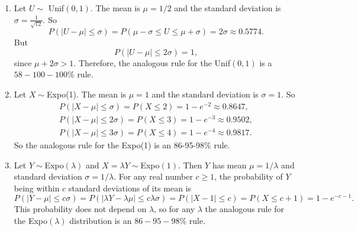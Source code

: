 

\setcounter{theorem}{5}
\begin{exercise}[BH.5.6] 
\begin{solution}
    \begin{enumerate}
        \item Let $U \sim$  {Unif}$(0,1)$. The mean is $\mu=1 / 2$ and the standard deviation is $\sigma=\frac{1}{\sqrt{12}}$. So
        $$
        P(|U-\mu| \leq \sigma)=P(\mu-\sigma \leq U \leq \mu+\sigma)=2 \sigma \approx 0.5774 .
        $$
        But
        $$
        P(|U-\mu| \leq 2 \sigma)=1,
        $$
        since $\mu+2 \sigma>1$. Therefore, the analogous rule for the  {Unif}$(0,1)$ is a $58-100-100 \%$ rule.
        \item Let $X \sim${Expo}(1). The mean is $\mu=1$ and the standard deviation is $\sigma=1$. So
        $$
        \begin{gathered}
            P(|X-\mu| \leq \sigma)=P(X \leq 2)=1-e^{-2} \approx 0.8647, \\
            P(|X-\mu| \leq 2 \sigma)=P(X \leq 3)=1-e^{-3} \approx 0.9502, \\
            P(|X-\mu| \leq 3 \sigma)=P(X \leq 4)=1-e^{-4} \approx 0.9817 .
        \end{gathered}
        $$
        So the analogous rule for the Expo(1) is an 86-95-98\% rule.
        \item Let $Y \sim${Expo}$(\lambda)$ and $X=\lambda Y \sim${Expo}$(1)$. Then $Y$ has mean $\mu=1 / \lambda$ and standard deviation $\sigma=1 / \lambda$. For any real number $c \geq 1$, the probability of $Y$ being within $c$ standard deviations of its mean is
        $$
        P(|Y-\mu| \leq c \sigma)=P(|\lambda Y-\lambda \mu| \leq c \lambda \sigma)=P(|X-1| \leq c)=P(X \leq c+1)=1-e^{-c-1} .
        $$
        This probability does not depend on $\lambda$, so for any $\lambda$ the analogous rule for the   {Expo}$(\lambda)$ distribution is an $86-95-98 \%$ rule.
    \end{enumerate}
\end{solution}
\end{exercise}


